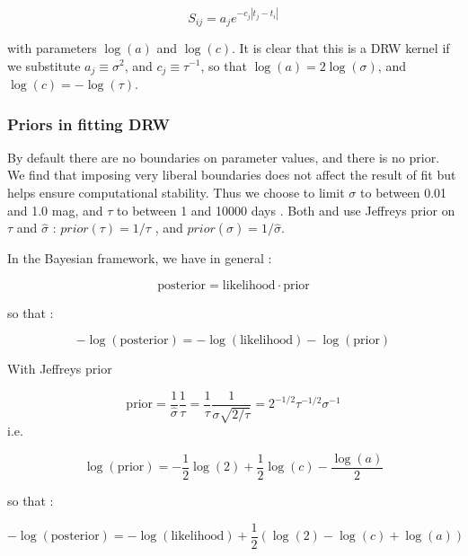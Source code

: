 \documentclass[fleqn,usenatbib]{mnras}  %
\begin{document}
\begin{equation}
S_{ij} = a_{j} e^ {-c_{j} | t_{j} - t_{i}|}
\end{equation}

with parameters  $\log{(a)}$ and $\log{(c)}$.    It is clear that this is a DRW kernel if we substitute  $a_{j} \equiv \sigma^{2}$, and  $c_{j} \equiv \tau^{-1}$, so that $\log{(a)} = 2 \log ( \sigma)$, and $\log{(c)} = - \log (\tau)$.  

\subsubsection{Priors in fitting DRW}
By default there are no boundaries on parameter values, and there is no prior.  We find that imposing very liberal boundaries does not affect the result of fit but helps ensure computational stability. Thus we choose to limit $\sigma$ to between 0.01 and 1.0 mag, and $\tau$ to between 1 and 10000 days . 
Both \cite{macleod2011}  and \cite{kozlowski2017a} use Jeffreys prior \citep{jeffreys46} on $\tau$ and $\hat{\sigma}$ : $prior(\tau) = 1 / \tau$ ,  and $prior(\hat{\sigma}) = 1 / \hat{\sigma}$. 


In the Bayesian framework, we have in general : 

\begin{equation}
\mathrm{posterior} = \mathrm{likelihood} \cdot \mathrm{prior}
\end{equation}

so that :

\begin{equation}
-\log{(\mathrm{posterior})} = -\log{(\mathrm{likelihood})} - \log{(\mathrm{prior})}
\end{equation}

With  Jeffreys prior

\begin{equation}
\mathrm{prior} = \frac{1}{\hat{\sigma}}\frac{1}{\tau} = \frac{1}{\tau}\frac{1}{\sigma\sqrt{2/\tau}}=2^{-1/2}\tau^{-1/2}\sigma^{-1}
\end{equation}
i.e. 

\begin{equation}
\log{(\mathrm{prior})} = -\frac{1}{2}\log{(2)} + \frac{1}{2}\log{(c)}-\frac{\log{(a)}}{2}
\end{equation}

so that :

\begin{equation}
-\log{(\mathrm{posterior})} = -\log{(\mathrm{likelihood})} + \frac{1}{2}\left( \log{(2)} - \log{(c)} + \log{(a)} \right) 
\end{equation}
\end{document}
